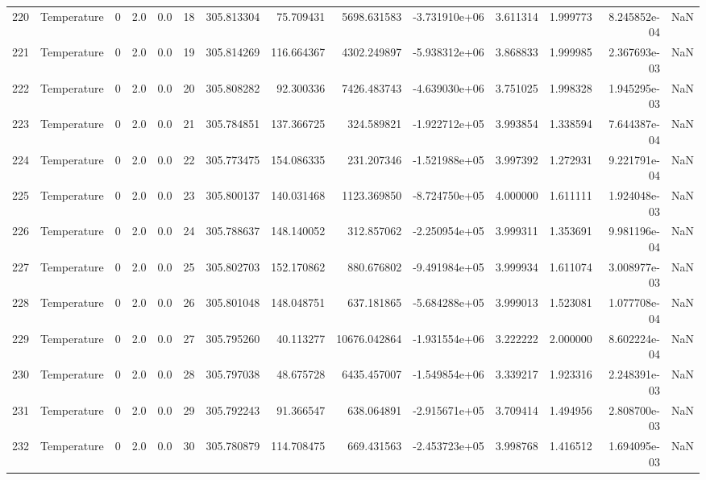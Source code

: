 \begin{tabular}{llrrrrrrrrrrrr}
220 &  Temperature &       0 &  2.0 &  0.0 &   18 &  305.813304 &    75.709431 &    5698.631583 & -3.731910e+06 &  3.611314 &  1.999773 &  8.245852e-04 &      NaN \\
221 &  Temperature &       0 &  2.0 &  0.0 &   19 &  305.814269 &   116.664367 &    4302.249897 & -5.938312e+06 &  3.868833 &  1.999985 &  2.367693e-03 &      NaN \\
222 &  Temperature &       0 &  2.0 &  0.0 &   20 &  305.808282 &    92.300336 &    7426.483743 & -4.639030e+06 &  3.751025 &  1.998328 &  1.945295e-03 &      NaN \\
223 &  Temperature &       0 &  2.0 &  0.0 &   21 &  305.784851 &   137.366725 &     324.589821 & -1.922712e+05 &  3.993854 &  1.338594 &  7.644387e-04 &      NaN \\
224 &  Temperature &       0 &  2.0 &  0.0 &   22 &  305.773475 &   154.086335 &     231.207346 & -1.521988e+05 &  3.997392 &  1.272931 &  9.221791e-04 &      NaN \\
225 &  Temperature &       0 &  2.0 &  0.0 &   23 &  305.800137 &   140.031468 &    1123.369850 & -8.724750e+05 &  4.000000 &  1.611111 &  1.924048e-03 &      NaN \\
226 &  Temperature &       0 &  2.0 &  0.0 &   24 &  305.788637 &   148.140052 &     312.857062 & -2.250954e+05 &  3.999311 &  1.353691 &  9.981196e-04 &      NaN \\
227 &  Temperature &       0 &  2.0 &  0.0 &   25 &  305.802703 &   152.170862 &     880.676802 & -9.491984e+05 &  3.999934 &  1.611074 &  3.008977e-03 &      NaN \\
228 &  Temperature &       0 &  2.0 &  0.0 &   26 &  305.801048 &   148.048751 &     637.181865 & -5.684288e+05 &  3.999013 &  1.523081 &  1.077708e-04 &      NaN \\
229 &  Temperature &       0 &  2.0 &  0.0 &   27 &  305.795260 &    40.113277 &   10676.042864 & -1.931554e+06 &  3.222222 &  2.000000 &  8.602224e-04 &      NaN \\
230 &  Temperature &       0 &  2.0 &  0.0 &   28 &  305.797038 &    48.675728 &    6435.457007 & -1.549854e+06 &  3.339217 &  1.923316 &  2.248391e-03 &      NaN \\
231 &  Temperature &       0 &  2.0 &  0.0 &   29 &  305.792243 &    91.366547 &     638.064891 & -2.915671e+05 &  3.709414 &  1.494956 &  2.808700e-03 &      NaN \\
232 &  Temperature &       0 &  2.0 &  0.0 &   30 &  305.780879 &   114.708475 &     669.431563 & -2.453723e+05 &  3.998768 &  1.416512 &  1.694095e-03 &      NaN \\

\end{tabular}
